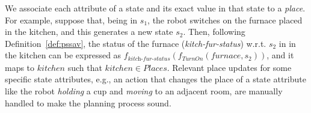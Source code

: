 \documentclass[letterpaper]{article} %
\newtheorem{definition}{Definition}
\begin{document}
We associate each attribute of a state and its exact value in that state to a \textit{place}. 
For example, suppose that, being in $s_1$, the robot switches on the furnace placed in the kitchen, and this generates a new state $s_2$. 
Then, following Definition~\ref{def:pssav}, the status of the furnace (\textit{kitch-fur-status}) w.r.t. 
$s_2$ in in the kitchen can be expressed as 
$f_{\textit{kitch-fur-status}} (f_{\textit{TurnOn}} (\textit{furnace}, s_2))$, and it maps to $kitchen$ such that $kitchen \in \mathit{Places}$.
Relevant place updates for some specific state attributes, e.g., an action that changes the place of a state attribute like the robot \textit{holding} a cup and \textit{moving} to an adjacent room, are manually handled to make the planning process sound.



\end{document}
